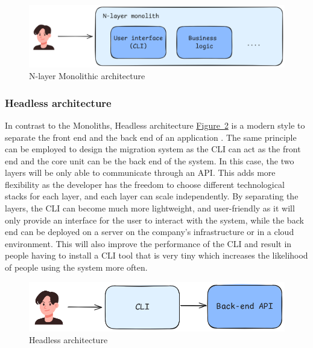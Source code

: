 \documentclass[twocolumn]{article}
\newcommand{\FigRef}[1]{\hyperref[#1]{Figure~\ref{#1}}}
\begin{document}
\begin{figure}[H]
    \centering
    \includegraphics[width=\linewidth]{images/n-layer-architecture.png}
    \caption{N-layer Monolithic architecture}
    \label{fig:n-layer-monolithic-architecture}
\end{figure}

\subsubsection{Headless architecture}
In contrast to the Monoliths, Headless architecture \FigRef{fig:headless-architecture} is a modern style to separate the front end and the back end of an application \cite{Pachiyappan-2020}. The same principle can be employed to design the migration system as the CLI can act as the front end and the core unit can be the back end of the system. In this case, the two layers will be only able to communicate through an API. This adds more flexibility as the developer has the freedom to choose different technological stacks for each layer, and each layer can scale independently. By separating the layers, the CLI can become much more lightweight, and user-friendly as it will only provide an interface for the user to interact with the system, while the back end can be deployed on a server on the company's infrastructure or in a cloud environment. This will also improve the performance of the CLI and result in people having to install a CLI tool that is very tiny which increases the likelihood of people using the system more often.

\begin{figure}[H]
    \centering
    \includegraphics[width=\linewidth]{images/headless-architecture.png}
    \caption{Headless architecture}
    \label{fig:headless-architecture}
\end{figure}
\end{document}
